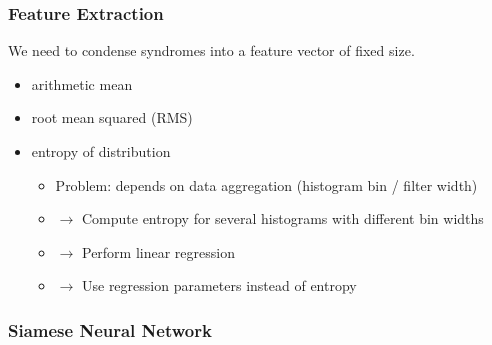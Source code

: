 \documentclass{beamer}
\begin{document}
\begin{frame}
  \frametitle{Feature Extraction}
  We need to condense syndromes into a feature vector of fixed size.
  \par\bigskip
  \begin{itemize}
  \item arithmetic mean
  \item root mean squared (RMS)
  \end{itemize}
  \begin{itemize}
  \item<4-> entropy of distribution
    \begin{itemize}
    \item Problem: depends on data aggregation (histogram bin / filter width)
    \item $\to$ Compute entropy for several histograms with different bin widths
    \item $\to$ Perform linear regression
    \item $\to$ Use regression parameters instead of entropy
    \end{itemize}
  \end{itemize}
\end{frame}


\begin{frame}
  \frametitle{Siamese Neural Network}
  \begin{center}
    \newcommand*{\ScaleFactor}{0.9}%
    \providecommand*{\SubfigLabelSM}{}%
    \providecommand*{\SubfigLabelGM}{}%
    \newcommand*{\PrimaryColor}{KITblue}%
    \newcommand*{\SecondaryColor}{KITblue}%
    
  \end{center}
\end{frame}
\end{document}
